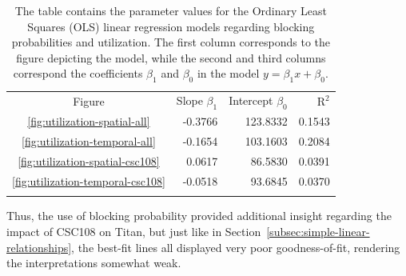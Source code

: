 \begin{table}
\caption{The table contains the parameter values for the Ordinary Least Squares
(OLS) linear regression models regarding blocking probabilities and utilization.
The first column corresponds to the figure depicting the model, while the
second and third columns correspond the coefficients $\beta_1$ and $\beta_0$ in
the model $y = \beta_{1}x + \beta_0$.}
\label{tab:blocking-utilization-params}       %
\begin{tabular}{crrr}
\hline\noalign{\smallskip}
Figure  & Slope $\beta_1$ & Intercept $\beta_0$     & $\text{R}^2$ \\
\noalign{\smallskip}\hline\noalign{\smallskip}
\ref{fig:utilization-spatial-all}       &   -0.3766 &   123.8332 & 0.1543 \\
\ref{fig:utilization-temporal-all}    &     -0.1654 &   103.1603 & 0.2084 \\
\ref{fig:utilization-spatial-csc108}  &      0.0617 &    86.5830 & 0.0391 \\
\ref{fig:utilization-temporal-csc108} &     -0.0518 &    93.6845 & 0.0370 \\
\noalign{\smallskip}\hline
\end{tabular}
\end{table}

Thus, the use of blocking probability provided additional insight regarding the
impact of CSC108 on Titan, but just like in
Section~\ref{subsec:simple-linear-relationships}, the best-fit lines all
displayed very poor goodness-of-fit, rendering the interpretations somewhat
weak.

